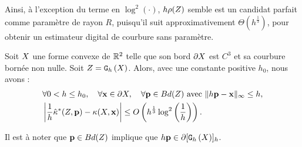 Ainsi, à l'exception du terme en $\log^2(\cdot)$, $h \rho(Z)$ semble est
un candidat parfait comme paramètre de rayon $R$, puisqu'il suit
approximativement $\Theta(h^\frac{1}{3})$, pour obtenir un estimateur digital de
courbure sans paramètre.
%
\begin{theorem}{}
\label{thm:curvature-estimator-2d-pf-conv}
  Soit $X$ une forme convexe de $\mathbb{R}^2$ telle que son bord $\partial X$ est
  $C^3$ et sa courbure bornée non nulle. Soit $Z = \mathtt{G}_{h}\left(X\right)$. Alors, avec une
  constante positive $h_0$, nous avons :
  \begin{align}
    &\forall 0 < h \le h_0, \quad \forall \mathbf{x} \in \partial X, \quad \forall \mathbf{p} \in Bd({Z}) \text{~avec~} \| h\mathbf{p} -\mathbf{x}\|_\infty \le h, \nonumber\\
    &\left | \frac{1}{h}\hat{\kappa}^{*}(Z,\mathbf{p}) - \kappa(X,\mathbf{x}) \right| \le O\left( h^{\frac{1}{3}} \log^2 \left(\frac{1}{h}\right)\right) .
  \end{align}
\end{theorem}
%
Il est à noter que $\mathbf{p} \in Bd({Z})$ implique que $h\mathbf{p} \in
\partial \lbrack \mathtt{G}_{h}\left(X\right) \rbrack_{h}$.



